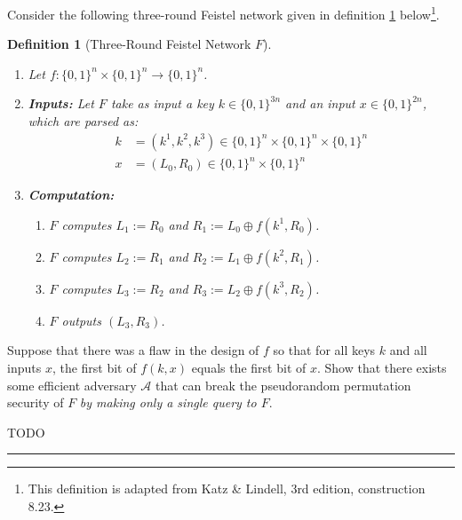 \documentclass[11pt]{article}
\newcommand{\A}{\mathcal{A}}
\newtheorem{definition}[theorem]{Definition}
\numberwithin{equation}{section}
\newcommand{\qed}{\hspace*{\fill}\rule{7pt}{7pt}}
\newenvironment{solution}{\noindent{\bf Solution}\hspace*{1em}}{\qed\medskip}
\begin{document}
Consider the following three-round Feistel network given in definition \ref{def:feistel_network} below\footnote{This definition is adapted from Katz \& Lindell, 3rd edition, construction 8.23.}.
\begin{definition}[Three-Round Feistel Network $F$]\label{def:feistel_network}
$ $
\begin{enumerate}
    \item Let $f: \{0,1\}^n \times \{0,1\}^{n}\to \{0,1\}^n$.
    \item \textbf{Inputs:} Let $F$ take as input a key $k \in \{0,1\}^{3n}$ and an input $x \in \{0,1\}^{2n}$, which are parsed as:
    \begin{align*}
        k &= (k^1, k^2, k^3) \in \{0,1\}^n \times \{0,1\}^n \times \{0,1\}^n\\
        x &= (L_0, R_0) \in \{0,1\}^{n} \times \{0,1\}^n
    \end{align*}
    \item \textbf{Computation:}
    \begin{enumerate}
        \item $F$ computes $L_1 := R_0$ and $R_1 := L_0 \oplus f(k^1, R_0)$.
        \item $F$ computes $L_2 := R_1$ and $R_2 := L_1 \oplus f(k^2, R_1)$.
        \item $F$ computes $L_3 := R_2$ and $R_3 := L_2 \oplus f(k^3, R_2)$.
        \item $F$ outputs $(L_3, R_3)$.
    \end{enumerate}
\end{enumerate}
\end{definition}

Suppose that there was a flaw in the design of $f$ so that for all keys $k$ and all inputs $x$, the first bit of $f(k, x)$ equals the first bit of $x$. Show that there exists some efficient adversary $\A$ that can break the pseudorandom permutation security of $F$ \textit{by making only a single query to $F$}.\newline

\begin{solution}
    TODO
\end{solution}
\end{document}
